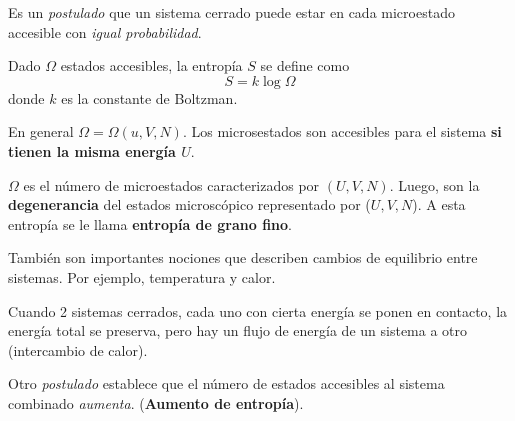 Es un \textit{postulado} que un sistema cerrado puede estar en cada microestado accesible con \textit{igual probabilidad}.

Dado $\Omega$ estados accesibles, la entropía $S$ se define como
\begin{equation}
\boxed{  S=k\log \Omega}
\end{equation}
donde $k$ es la constante de Boltzman.

En general $\Omega=\Omega (u,V,N)$. Los microsestados son accesibles para el sistema \textbf{si tienen la misma energía $U$}.

$\Omega$ es el número de microestados caracterizados por $(U,V,N)$. Luego, son la \textbf{degenerancia} del estados microscópico representado por ($U,V,N$). A esta entropía se le llama \textbf{entropía de grano fino}.

También son importantes nociones que describen cambios de equilibrio entre sistemas. Por ejemplo, temperatura y calor.

Cuando 2 sistemas cerrados, cada uno con cierta energía se ponen en contacto, la energía total se preserva, pero hay un flujo de energía de un sistema a otro (intercambio de calor).

Otro \textit{postulado} establece que el número de estados accesibles al sistema combinado \textit{aumenta}. (\textbf{Aumento de entropía}).

